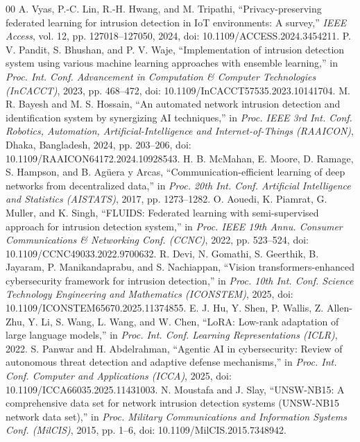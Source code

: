 \documentclass[conference]{IEEEtran}
\begin{document}
\begin{thebibliography}{00}
 A. Vyas, P.-C. Lin, R.-H. Hwang, and M. Tripathi, ``Privacy-preserving federated learning for intrusion detection in IoT environments: A survey,'' \textit{IEEE Access}, vol. 12, pp. 127018--127050, 2024, doi: 10.1109/ACCESS.2024.3454211.
 P. V. Pandit, S. Bhushan, and P. V. Waje, ``Implementation of intrusion detection system using various machine learning approaches with ensemble learning,'' in \textit{Proc. Int. Conf. Advancement in Computation \& Computer Technologies (InCACCT)}, 2023, pp. 468--472, doi: 10.1109/InCACCT57535.2023.10141704.
 M. R. Bayesh and M. S. Hossain, ``An automated network intrusion detection and identification system by synergizing AI techniques,'' in \textit{Proc. IEEE 3rd Int. Conf. Robotics, Automation, Artificial-Intelligence and Internet-of-Things (RAAICON)}, Dhaka, Bangladesh, 2024, pp. 203--206, doi: 10.1109/RAAICON64172.2024.10928543.
 H. B. McMahan, E. Moore, D. Ramage, S. Hampson, and B. Ag\"{u}era y Arcas, ``Communication-efficient learning of deep networks from decentralized data,'' in \textit{Proc. 20th Int. Conf. Artificial Intelligence and Statistics (AISTATS)}, 2017, pp. 1273--1282.
 O. Aouedi, K. Piamrat, G. Muller, and K. Singh, ``FLUIDS: Federated learning with semi-supervised approach for intrusion detection system,'' in \textit{Proc. IEEE 19th Annu. Consumer Communications \& Networking Conf. (CCNC)}, 2022, pp. 523--524, doi: 10.1109/CCNC49033.2022.9700632.
 R. Devi, N. Gomathi, S. Geerthik, B. Jayaram, P. Manikandaprabu, and S. Nachiappan, ``Vision transformers-enhanced cybersecurity framework for intrusion detection,'' in \textit{Proc. 10th Int. Conf. Science Technology Engineering and Mathematics (ICONSTEM)}, 2025, doi: 10.1109/ICONSTEM65670.2025.11374855.
 E. J. Hu, Y. Shen, P. Wallis, Z. Allen-Zhu, Y. Li, S. Wang, L. Wang, and W. Chen, ``LoRA: Low-rank adaptation of large language models,'' in \textit{Proc. Int. Conf. Learning Representations (ICLR)}, 2022.
 S. Panwar and H. Abdelrahman, ``Agentic AI in cybersecurity: Review of autonomous threat detection and adaptive defense mechanisms,'' in \textit{Proc. Int. Conf. Computer and Applications (ICCA)}, 2025, doi: 10.1109/ICCA66035.2025.11431003.
 N. Moustafa and J. Slay, ``UNSW-NB15: A comprehensive data set for network intrusion detection systems (UNSW-NB15 network data set),'' in \textit{Proc. Military Communications and Information Systems Conf. (MilCIS)}, 2015, pp. 1--6, doi: 10.1109/MilCIS.2015.7348942.

\end{thebibliography}
\end{document}
